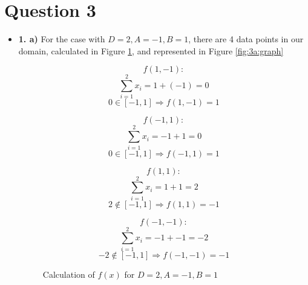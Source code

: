 \documentclass[12pt]{article}
\begin{document}
\section*{Question 3}
\begin{itemize}
    \item \textbf{1. a)} For the case with $D=2, A=-1, B=1$, there are 4 data points in our domain, calculated in Figure \ref{fig:3a:calc}, and represented in Figure \ref{fig:3a:graph}

        \begin{figure}[H]
        \begin{minipage}{0.5\linewidth}
            \begin{equation*}
                f(1, -1):
            \end{equation*}
            \begin{equation*}
                \sum_{i=1}^{2} x_i = 1 + (-1) = 0
            \end{equation*}
            \begin{equation*}
                0 \in [-1, 1] \Rightarrow f(1, -1) = 1
            \end{equation*}

            \begin{equation*}
                f(-1, 1):
            \end{equation*}
            \begin{equation*}
                \sum_{i=1}^{2} x_i = -1 + 1 = 0
            \end{equation*}
            \begin{equation*}
                0 \in [-1, 1] \Rightarrow f(-1, 1) = 1
            \end{equation*}
        \end{minipage}
        \begin{minipage}{0.5\linewidth}

            \begin{equation*}
                f(1, 1):
            \end{equation*}
            \begin{equation*}
                \sum_{i=1}^{2} x_i = 1 + 1 = 2
            \end{equation*}
            \begin{equation*}
                2 \notin [-1, 1] \Rightarrow f(1, 1) = -1
            \end{equation*}

            \begin{equation*}
                f(-1, -1):
            \end{equation*}
            \begin{equation*}
                \sum_{i=1}^{2} x_i = -1 + -1 = -2
            \end{equation*}
            \begin{equation*}
                -2 \notin [-1, 1] \Rightarrow f(-1, -1) = -1
            \end{equation*}
        \end{minipage}
            \caption{Calculation of $f(x)$ for $D=2, A=-1, B=1$}
            \label{fig:3a:calc}
        \end{figure}


\end{itemize}
\end{document}
